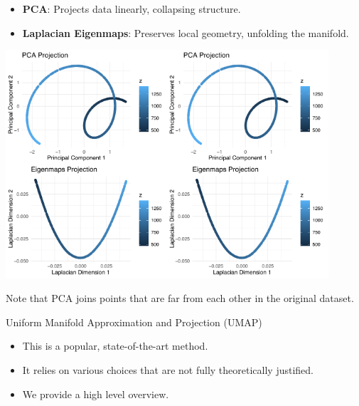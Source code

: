 \documentclass[11pt,handout,aspectratio=169]{beamer}
\begin{document}
\begin{frame}{}
\begin{itemize}
    \item \textbf{PCA}: Projects data linearly, collapsing structure.
    \item \textbf{Laplacian Eigenmaps}: Preserves local geometry, unfolding the manifold.
\end{itemize}
\begin{center}
    \includegraphics[width=0.45\textwidth]{pics/twistedA.pdf}\includegraphics[width=0.45\textwidth]{pics/twistedB.pdf}
\end{center}
Note that PCA joins points that are far from each other in the original dataset.
\end{frame}

\begin{frame}{}
    \begin{center}
        \alert{\Huge Uniform Manifold Approximation and Projection (UMAP)}
    \end{center}
    \begin{itemize}
    \item This is a popular, state-of-the-art method. 
    	\item It relies on various choices that are not fully theoretically justified. 
    	\item We provide a high level overview.
    \end{itemize}
\end{frame}
\end{document}

